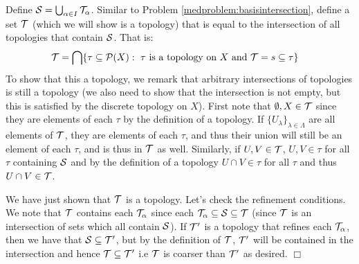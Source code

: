 \documentclass{article}
\begin{document}
 {
    Define $\mathcal{S} = \bigcup_{\alpha\in I}\mathcal{T}_{\alpha}$. Similar to Problem \ref{medproblem:basisintersection}, define a set $\mathcal{T}$ (which we will show is a topology) that is equal to the intersection of all topologies that contain $\mathcal{S}$. That is:
    \begin{align*}
        \mathcal{T} &= \bigcap \{\tau\subseteq \mathcal{P}(X):\ \tau\text{ is a topology on }X \text{ and }\mathcal{T}=s\subseteq \tau\}
    \end{align*}
    To show that this a topology, we remark that arbitrary intersections of topologies is still a topology (we also need to show that the intersection is not empty, but this is satisfied by the discrete topology on $X$). First note that $\emptyset, X\in \mathcal{T}$ since they are elements of each $\tau$ by the definition of a topology. If $\{U_{\lambda}\}_{\lambda\in\Lambda}$ are all elements of $\mathcal{T}$, they are elements of each $\tau$, and thus their union will still be an element of each $\tau$, and is thus in $\mathcal{T}$ as well. Similarly, if $U,V\in \mathcal{T}$, $U,V\in \tau$ for all $\tau$ containing $\mathcal{S}$ and by the definition of a topology $U\cap V \in \tau$ for all $\tau$ and thus $U\cap V\in \mathcal{T}$.

    We have just shown that $\mathcal{T}$ is a topology. Let's check the refinement conditions. We note that $\mathcal{T}$ contains each $\mathcal{T}_{\alpha}$ since each $\mathcal{T}_{\alpha}\subseteq \mathcal{S} \subseteq \mathcal{T}$ (since $\mathcal{T}$ is an intersection of sets which all contain $\mathcal{S}$). If $\mathcal{T}'$ is a topology that refines each $\mathcal{T}_{\alpha}$, then we have that $\mathcal{S}\subseteq \mathcal{T}'$, but by the definition of $\mathcal{T}$, $\mathcal{T}'$ will  be contained in the intersection and hence $\mathcal{T}\subseteq \mathcal{T}'$ i.e $\mathcal{T}$ is coarser than $\mathcal{T}'$ as desired. $\Box$
}
\end{document}

